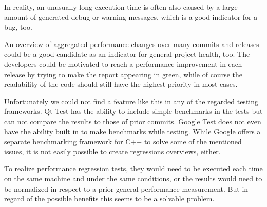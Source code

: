 \documentclass{scrreprt}
\begin{document}
In reality, an unusually long execution time is often also caused by a large amount of generated debug or warning messages, which is a good indicator for a bug, too.

An overview of aggregated performance changes over many commits and releases could be a good candidate as an indicator for general project health, too. The developers could be motivated to reach a performance improvement in each release by trying to make the report appearing in green, while of course the readability of the code should still have the highest priority in most cases.

Unfortunately we could not find a feature like this in any of the regarded testing frameworks. Qt Test has the ability to include simple benchmarks in the tests but can not compare the results to those of prior commits. Google Test does not even have the ability built in to make benchmarks while testing. While Google offers a separate benchmarking framework for C++ to solve some of the mentioned issues, it is not easily possible to create regressions overviews, either.

To realize performance regression tests, they would need to be executed each time on the same machine and under the same conditions, or the results would need to be normalized in respect to a prior general performance measurement. But in regard of the possible benefits this seems to be a solvable problem.
\end{document}

